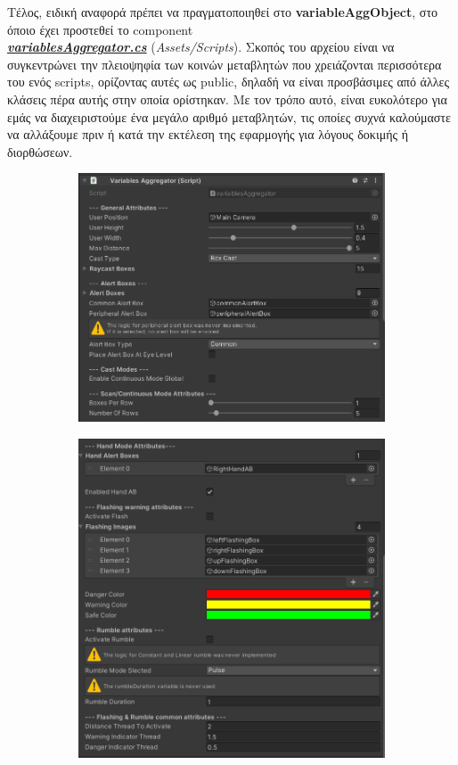 Τέλος, ειδική αναφορά πρέπει να πραγματοποιηθεί στο  \textbf{variableAggObject}, στο όποιο έχει προστεθεί το component\\
\hyperref[lst:variablesAggregator]{\textit{\textbf{variablesAggregator.cs}}} (\textit{Assets/Scripts}). Σκοπός του αρχείου είναι να συγκεντρώνει την πλειοψηφία των κοινών μεταβλητών που χρειάζονται περισσότερα του ενός scripts, ορίζοντας αυτές ως public, δηλαδή να είναι προσβάσιμες από άλλες κλάσεις πέρα αυτής στην οποία ορίστηκαν. Με τον τρόπο αυτό, είναι ευκολότερο για εμάς να διαχειριστούμε ένα μεγάλο αριθμό μεταβλητών, τις οποίες συχνά καλούμαστε να αλλάξουμε πριν ή κατά την εκτέλεση της εφαρμογής για λόγους δοκιμής ή διορθώσεων.

\begin{figure}[!h]
    \centering
    \begin{subfigure}{0.5\textwidth}
        \centering
        \includegraphics[width=0.9\linewidth]{images/develop_inspVariableAggObjectOne.png}
        \caption{}
    \end{subfigure}%
    \begin{subfigure}{0.5\textwidth}
        \centering
        \includegraphics[width=0.9\linewidth]{images/develop_inspVariableAggObjectTwo.png}

\end{subfigure}
\end{figure}
